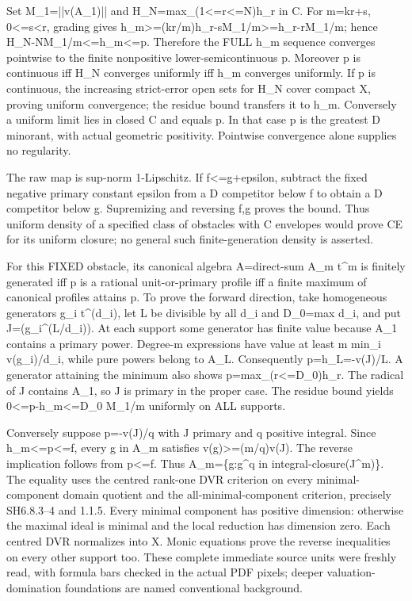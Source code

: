 Set M\_1=||v(A\_1)|| and H\_N=max\_(1\textless{}=r\textless{}=N)h\_r in C. For m=kr+s, 0\textless{}=s\textless{}r, grading gives h\_m\textgreater{}=(kr/m)h\_r-sM\_1/m\textgreater{}=h\_r-rM\_1/m; hence H\_N-NM\_1/m\textless{}=h\_m\textless{}=p. Therefore the FULL h\_m sequence converges pointwise to the finite nonpositive lower-semicontinuous p. Moreover p is continuous iff H\_N converges uniformly iff h\_m converges uniformly. If p is continuous, the increasing strict-error open sets for H\_N cover compact X, proving uniform convergence; the residue bound transfers it to h\_m. Conversely a uniform limit lies in closed C and equals p. In that case p is the greatest D minorant, with actual geometric positivity. Pointwise convergence alone supplies no regularity.

The raw map is sup-norm 1-Lipschitz. If f\textless{}=g+epsilon, subtract the fixed negative primary constant epsilon from a D competitor below f to obtain a D competitor below g. Supremizing and reversing f,g proves the bound. Thus uniform density of a specified class of obstacles with C envelopes would prove CE for its uniform closure; no general such finite-generation density is asserted.

For this FIXED obstacle, its canonical algebra A=direct-sum A\_m t\textasciicircum{}m is finitely generated iff p is a rational unit-or-primary profile iff a finite maximum of canonical profiles attains p. To prove the forward direction, take homogeneous generators g\_i t\textasciicircum{}(d\_i), let L be divisible by all d\_i and D\_0=max d\_i, and put J=(g\_i\textasciicircum{}(L/d\_i)). At each support some generator has finite value because A\_1 contains a primary power. Degree-m expressions have value at least m min\_i v(g\_i)/d\_i, while pure powers belong to A\_L. Consequently p=h\_L=-v(J)/L. A generator attaining the minimum also shows p=max\_(r\textless{}=D\_0)h\_r. The radical of J contains A\_1, so J is primary in the proper case. The residue bound yields 0\textless{}=p-h\_m\textless{}=D\_0 M\_1/m uniformly on ALL supports.

Conversely suppose p=-v(J)/q with J primary and q positive integral. Since h\_m\textless{}=p\textless{}=f, every g in A\_m satisfies v(g)\textgreater{}=(m/q)v(J). The reverse implication follows from p\textless{}=f. Thus A\_m=\{g:g\textasciicircum{}q in integral-closure(J\textasciicircum{}m)\}. The equality uses the centred rank-one DVR criterion on every minimal-component domain quotient and the all-minimal-component criterion, precisely SH6.8.3--4 and 1.1.5. Every minimal component has positive dimension: otherwise the maximal ideal is minimal and the local reduction has dimension zero. Each centred DVR normalizes into X. Monic equations prove the reverse inequalities on every other support too. These complete immediate source units were freshly read, with formula bars checked in the actual PDF pixels; deeper valuation-domination foundations are named conventional background.

